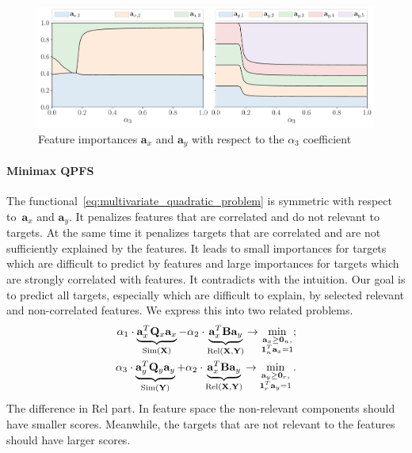 \documentclass[12pt,twoside]{article}
\newcommand{\ba}{\mathbf{a}}
\newcommand{\bY}{\mathbf{Y}}
\newcommand{\bX}{\mathbf{X}}
\newcommand{\bQ}{\mathbf{Q}}
\newcommand{\bOne}{\boldsymbol{1}}
\newcommand{\bZero}{\boldsymbol{0}}
\begin{document}
\begin{figure}
	\centering
	\includegraphics[width=\linewidth]{figs/features_vs_alpha.pdf}
	\caption{Feature importances $\ba_x$ and $\ba_y$ with respect to the $\alpha_3$ coefficient}
	\label{fig:features_vs_alpha}
\end{figure}

\paragraph{Minimax QPFS}
The functional~\eqref{eq:multivariate_quadratic_problem} is symmetric with respect to~$\ba_x$ and $\ba_y$. 
It penalizes features that are correlated and do not relevant to targets. 
At the same time it penalizes targets that are correlated and are not sufficiently explained by the features. 
It leads to small importances for targets which are difficult to predict by features and large importances for targets which are strongly correlated with features. 
It contradicts with the intuition. 
Our goal is to predict all targets, especially which are difficult to explain, by selected relevant and non-correlated features. We express this into two related problems. 
\begin{align}
	\alpha_1 \cdot \underbrace{\ba_x^T \bQ_x \ba_x}_{\text{Sim}(\bX)} - \alpha_2 \cdot \underbrace{\vphantom{()} \ba_x^T\mathbf{B} \ba_y}_{\text{Rel}(\bX, \bY)} \rightarrow \min_{\substack{\ba_x \geq \bZero_n, \\ \bOne_n^T\ba_x=1}}; 
	\label{eq:x_qpfs}\\
	\alpha_3 \cdot \underbrace{\ba_y^T \bQ_y \ba_y}_{\text{Sim}(\bY)} + \alpha_2 \cdot \underbrace{\vphantom{()} \ba_x^T \mathbf{B} \ba_y}_{\text{Rel}(\bX, \bY)} \rightarrow \min_{\substack{\ba_y \geq \bZero_r,  \\ \bOne_r^T\ba_y=1}}.
	\label{eq:y_qpfs}
\end{align}
The difference in Rel part.
In feature space the non-relevant components should have smaller scores. 
Meanwhile, the targets that are not relevant to the features should have larger scores.
\end{document}
